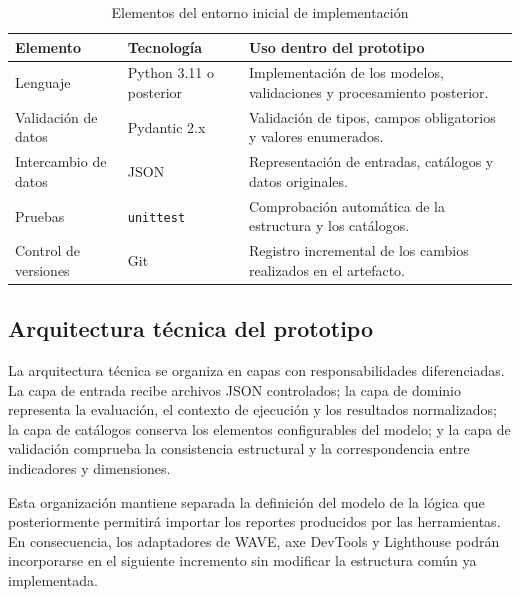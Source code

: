 \begin{table}[H]
\centering
\caption{Elementos del entorno inicial de implementación}
\label{tab:entorno-implementacion}
\begin{tabularx}{\textwidth}{p{3.5cm}p{3.2cm}X}
\toprule
\textbf{Elemento} & \textbf{Tecnología} & \textbf{Uso dentro del prototipo}\\
\midrule
Lenguaje & Python 3.11 o posterior & Implementación de los modelos, validaciones y procesamiento posterior.\\
Validación de datos & Pydantic 2.x & Validación de tipos, campos obligatorios y valores enumerados.\\
Intercambio de datos & JSON & Representación de entradas, catálogos y datos originales.\\
Pruebas & \texttt{unittest} & Comprobación automática de la estructura y los catálogos.\\
Control de versiones & Git & Registro incremental de los cambios realizados en el artefacto.\\
\bottomrule
\end{tabularx}
\end{table}

\subsection{Arquitectura técnica del prototipo}

La arquitectura técnica se organiza en capas con responsabilidades
diferenciadas. La capa de entrada recibe archivos JSON controlados; la capa de
dominio representa la evaluación, el contexto de ejecución y los resultados
normalizados; la capa de catálogos conserva los elementos configurables del
modelo; y la capa de validación comprueba la consistencia estructural y la
correspondencia entre indicadores y dimensiones.

Esta organización mantiene separada la definición del modelo de la lógica que
posteriormente permitirá importar los reportes producidos por las herramientas.
En consecuencia, los adaptadores de WAVE, axe DevTools y Lighthouse podrán
incorporarse en el siguiente incremento sin modificar la estructura común ya
implementada.

